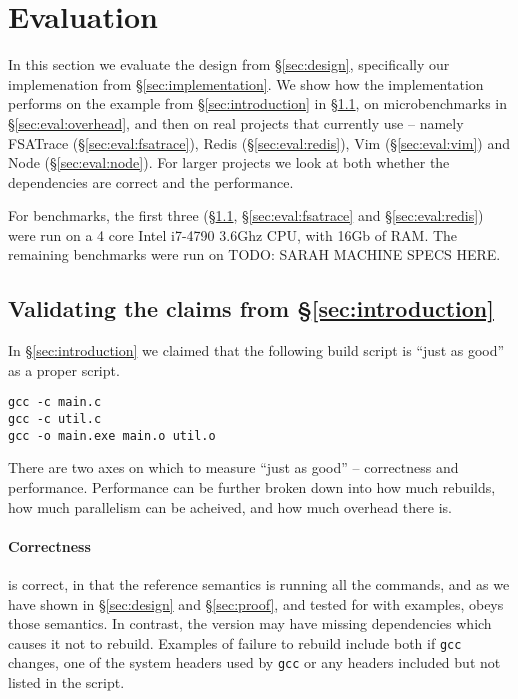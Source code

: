 \section{Evaluation}
\label{sec:evaluation}

In this section we evaluate the design from \S\ref{sec:design}, specifically our implemenation from \S\ref{sec:implementation}. We show how the implementation performs on the example from \S\ref{sec:introduction} in \S\ref{sec:eval:introduction}, on microbenchmarks in \S\ref{sec:eval:overhead}, and then on real projects that currently use \Make{} -- namely FSATrace (\S\ref{sec:eval:fsatrace}), Redis (\S\ref{sec:eval:redis}), Vim (\S\ref{sec:eval:vim}) and Node (\S\ref{sec:eval:node}). For larger projects we look at both whether the dependencies are correct and the performance.

For benchmarks, the first three (\S\ref{sec:eval:introduction}, \S\ref{sec:eval:fsatrace} and \S\ref{sec:eval:redis}) were run on a 4 core Intel i7-4790 3.6Ghz CPU, with 16Gb of RAM. The remaining benchmarks were run on TODO: SARAH MACHINE SPECS HERE.

\subsection{Validating the claims from \S\ref{sec:introduction}}
\label{sec:eval:introduction}

In \S\ref{sec:introduction} we claimed that the following build script is ``just as good'' as a proper \Make script.

\begin{verbatim}
gcc -c main.c
gcc -c util.c
gcc -o main.exe main.o util.o
\end{verbatim}

There are two axes on which to measure ``just as good'' -- correctness and performance. Performance can be further broken down into how much rebuilds, how much parallelism can be acheived, and how much overhead there is.

\paragraph{Correctness} \Rattle is correct, in that the reference semantics is running all the commands, and as we have shown in \S\ref{sec:design} and \S\ref{sec:proof}, and tested for with examples, \Rattle obeys those semantics. In contrast, the \Make version may have missing dependencies which causes it not to rebuild. Examples of failure to rebuild include both if \texttt{gcc} changes, one of the system headers used by \texttt{gcc} or any headers included but not listed in the \Make script.

